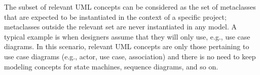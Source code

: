 The subset of relevant UML concepts can be considered as the set of metaclasses that are expected to be instantiated
in the context of a specific project; metaclasses outside the relevant set are never instantiated in any model.
A typical example is when designers assume that they will only use, e.g., use case diagrams.
In this scenario, relevant UML concepts are only those pertaining to use case diagrams (e.g., actor, use case, association)
and there is no need to keep modeling concepts for state machines, sequence diagrams, and so on.
%

